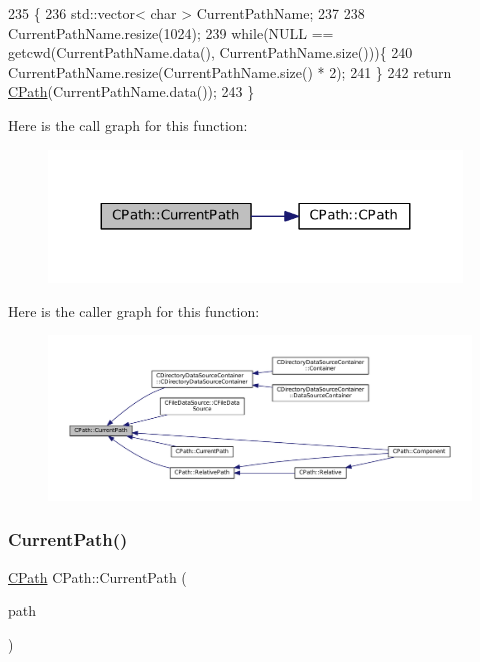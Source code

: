 \begin{DoxyCode}
235                         \{
236     std::vector< char > CurrentPathName;
237 
238     CurrentPathName.resize(1024);
239     \textcolor{keywordflow}{while}(NULL == getcwd(CurrentPathName.data(), CurrentPathName.size()))\{
240         CurrentPathName.resize(CurrentPathName.size() * 2);
241     \}
242     \textcolor{keywordflow}{return} \hyperlink{classCPath_a26b6e34c8019d440136848f809c13897}{CPath}(CurrentPathName.data());
243 \}
\end{DoxyCode}
Here is the call graph for this function\+:\nopagebreak
\begin{figure}[H]
\begin{center}
\leavevmode
\includegraphics[width=311pt]{classCPath_a5161b834e754b217ddead2437eaaa223_cgraph}
\end{center}
\end{figure}
Here is the caller graph for this function\+:\nopagebreak
\begin{figure}[H]
\begin{center}
\leavevmode
\includegraphics[width=350pt]{classCPath_a5161b834e754b217ddead2437eaaa223_icgraph}
\end{center}
\end{figure}
\hypertarget{classCPath_a87ec01e5af0eb4e2184caf1d9ecc8892}{}\label{classCPath_a87ec01e5af0eb4e2184caf1d9ecc8892} 
\subsubsection{\texorpdfstring{Current\+Path()}{CurrentPath()}\hspace{0.1cm}{\footnotesize\ttfamily [2/2]}}
{\footnotesize\ttfamily \hyperlink{classCPath}{C\+Path} C\+Path\+::\+Current\+Path (\begin{DoxyParamCaption}\item[{const \hyperlink{classCPath}{C\+Path} \&}]{path }\end{DoxyParamCaption})\hspace{0.3cm}{\ttfamily [static]}}



